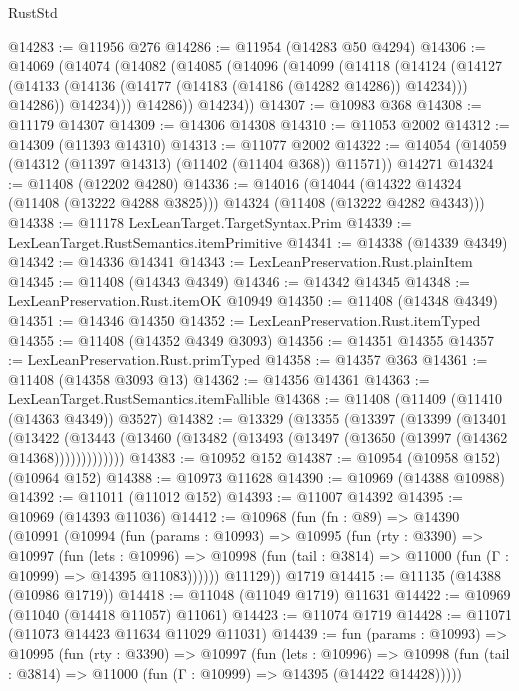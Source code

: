 \begin{lexlean}{RustStd}
\begin{coremodule}
@14283 := @11956 @276
@14286 := @11954 (@14283 @50 @4294)
@14306 := @14069
    (@14074
      (@14082
        (@14085
          (@14096
            (@14099
              (@14118
                (@14124
                  (@14127
                    (@14133 (@14136 (@14177 (@14183 (@14186 (@14282 @14286)) @14234))) @14286))
                  @14234)))
            @14286))
        @14234))
@14307 := @10983 @368
@14308 := @11179 @14307
@14309 := @14306 @14308
@14310 := @11053 @2002
@14312 := @14309 (@11393 @14310)
@14313 := @11077 @2002
@14322 := @14054 (@14059 (@14312 (@11397 @14313) (@11402 (@11404 @368)) @11571)) @14271
@14324 := @11408 (@12202 @4280)
@14336 := @14016
    (@14044 (@14322 @14324 (@11408 (@13222 @4288 @3825))) @14324 (@11408 (@13222 @4282 @4343)))
@14338 := @11178 LexLeanTarget.TargetSyntax.Prim
@14339 := LexLeanTarget.RustSemantics.itemPrimitive
@14341 := @14338 (@14339 @4349)
@14342 := @14336 @14341
@14343 := LexLeanPreservation.Rust.plainItem
@14345 := @11408 (@14343 @4349)
@14346 := @14342 @14345
@14348 := LexLeanPreservation.Rust.itemOK @10949
@14350 := @11408 (@14348 @4349)
@14351 := @14346 @14350
@14352 := LexLeanPreservation.Rust.itemTyped
@14355 := @11408 (@14352 @4349 @3093)
@14356 := @14351 @14355
@14357 := LexLeanPreservation.Rust.primTyped
@14358 := @14357 @363
@14361 := @11408 (@14358 @3093 @13)
@14362 := @14356 @14361
@14363 := LexLeanTarget.RustSemantics.itemFallible
@14368 := @11408 (@11409 (@11410 (@14363 @4349)) @3527)
@14382 := @13329
    (@13355
      (@13397
        (@13399
          (@13401
            (@13422
              (@13443 (@13460 (@13482 (@13493 (@13497 (@13650 (@13997 (@14362 @14368)))))))))))))
@14383 := @10952 @152
@14387 := @10954 (@10958 @152) (@10964 @152)
@14388 := @10973 @11628
@14390 := @10969 (@14388 @10988)
@14392 := @11011 (@11012 @152)
@14393 := @11007 @14392
@14395 := @10969 (@14393 @11036)
@14412 := @10968
    (fun (fn : @89) =>
    @14390
      (@10991
        (@10994
          (fun (params : @10993) =>
          @10995
            (fun (rty : @3390) =>
            @10997
              (fun (lets : @10996) =>
              @10998 (fun (tail : @3814) => @11000 (fun (Γ : @10999) => @14395 @11083))))))
        @11129))
    @1719
@14415 := @11135 (@14388 (@10986 @1719))
@14418 := @11048 (@11049 @1719) @11631
@14422 := @10969 (@11040 (@14418 @11057) @11061)
@14423 := @11074 @1719
@14428 := @11071 (@11073 @14423 @11634 @11029 @11031)
@14439 := fun (params : @10993) =>
  @10995
    (fun (rty : @3390) =>
    @10997
      (fun (lets : @10996) =>
      @10998 (fun (tail : @3814) => @11000 (fun (Γ : @10999) => @14395 (@14422 @14428)))))

\end{coremodule}
\end{lexlean}
